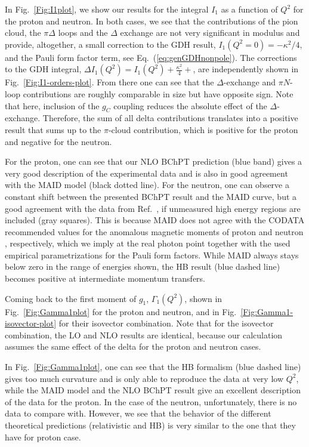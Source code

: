 \documentclass[twocolumn,prc,showpacs,nofootinbib,preprintnumbers,amsmath,amssymb,superscriptaddress]{revtex4-1}
\def\Eqref#1{Eq.~(\ref{eq:#1})}
\begin{document}
In Fig.~\ref{Fig:I1plot}, we show our results for the integral $I_1$ as a function of $Q^2$ for the proton and neutron.
In both cases, we see that the contributions of the pion cloud, the $\pi \Delta$ loops and the $\Delta$ exchange are not very significant in modulus and provide, altogether, a small correction to the GDH result, $I_1(Q^2=0)=-\kappa^2/4$, and the Pauli form factor term, see \Eqref{genGDHnonpole}.
The corrections to the GDH integral, $\Delta I_1(Q^2)=I_1(Q^2)+\frac{\kappa^2}{4} + $, are independently shown in Fig.~\ref{Fig:I1-orders-plot}.
From there one can see that the $\Delta$-exchange and $\pi N$-loop contributions are roughly comparable in size but have opposite sign. Note that here, inclusion of the $g_C$ coupling reduces the absolute effect of the $\Delta$-exchange. Therefore,
the sum of all delta contributions translates into a positive result that sums up to the $\pi$-cloud contribution, which is positive for the proton and negative for the neutron. 

For the proton, one can see that our NLO BChPT prediction (blue band) gives a very good description of the experimental data \cite{Prok:2008ev,Zielinski:2017gwp} and is also in good agreement with the MAID model \cite{MAID} (black dotted line). For the neutron, one can observe a constant shift between the presented BChPT result and the MAID curve, but a good agreement with the data from Ref.~\cite{Guler:2015}, if unmeasured high energy regions are included (gray squares). This is because MAID does not agree with the CODATA recommended values for the anomalous magnetic moments of proton and neutron \cite{Mohr:2012tt}, respectively, which we imply at the real photon point together with the used empirical parametrizations for the Pauli form factors. While MAID always stays below zero in the range of energies shown, the HB result \cite{Kao:2003jd} (blue dashed line) becomes positive at intermediate momentum transfers.


Coming back to the first moment of $g_1$, $\Gamma_1(Q^2)$, shown in Fig.~\ref{Fig:Gamma1plot} for the proton and neutron, and in Fig.~\ref{Fig:Gamma1-isovector-plot} for their isovector combination. Note that for the isovector combination, the LO and NLO results are identical, because our calculation assumes the same effect of the delta for the proton and neutron cases.

In Fig.~\ref{Fig:Gamma1plot}, one can see that the HB formalism (blue dashed line) gives too much curvature and is only able to reproduce the data at very low $Q^2$, while the MAID model and the NLO BChPT result give an excellent description of the data for the proton.
In the case of the neutron, unfortunately, there is no data to compare with. 
However, we see that the behavior of the different theoretical predictions (relativistic and HB) is very similar to the one that they have for proton case.
\end{document}
